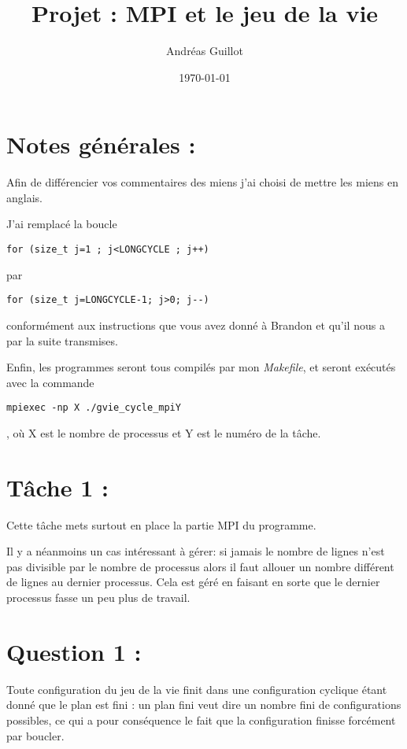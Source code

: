 \documentclass{article}
\title{Projet : MPI et le jeu de la vie}
\author{Andréas Guillot}
\date{\today}
\begin{document}
\maketitle

\section*{Notes générales :}

Afin de différencier vos commentaires des miens j'ai choisi de mettre les miens en anglais.

J'ai remplacé la boucle
\begin{verbatim}
for (size_t j=1 ; j<LONGCYCLE ; j++)
\end{verbatim} par \begin{verbatim}
for (size_t j=LONGCYCLE-1; j>0; j--)
\end{verbatim} conformément aux instructions que vous avez donné à Brandon et qu'il nous a par la suite transmises.

Enfin, les programmes seront tous compilés par mon \textit{Makefile}, et seront exécutés avec la commande \begin{verbatim}
mpiexec -np X ./gvie_cycle_mpiY
\end{verbatim}, où X est le nombre de processus et Y est le numéro de la tâche.

\section*{Tâche 1 :}

Cette tâche mets surtout en place la partie MPI du programme.

\medskip

Il y a néanmoins un cas intéressant à gérer: si jamais le nombre de lignes n'est pas divisible par le nombre de processus alors il faut allouer un nombre différent de lignes au dernier processus.
Cela est géré en faisant en sorte que le dernier processus fasse un peu plus de travail.

\section*{Question 1 :}

Toute configuration du jeu de la vie finit dans une configuration cyclique étant donné que le plan est fini : un plan fini veut dire un nombre fini de configurations possibles, ce qui a pour conséquence le fait que la configuration finisse forcément par boucler.
\end{document}
